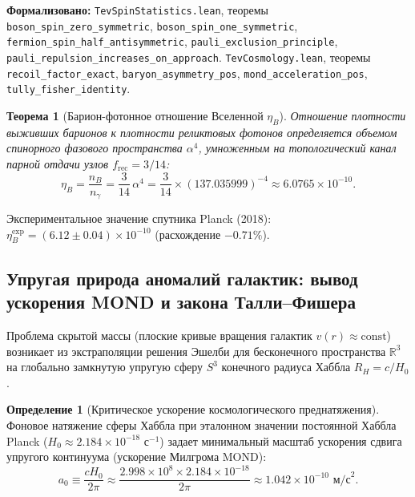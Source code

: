 \documentclass[11pt,a4paper]{article}
\newtheorem{theorem}{Теорема}
\theoremstyle{definition}
\newtheorem{definition}{Определение}
\theoremstyle{remark}
\begin{document}
\noindent\small\textbf{Формализовано:} \texttt{TevSpinStatistics.lean}, теоремы \texttt{boson_spin_zero_symmetric}, \texttt{boson_spin_one_symmetric}, \texttt{fermion_spin_half_antisymmetric}, \texttt{pauli_exclusion_principle}, \texttt{pauli_repulsion_increases_on_approach}.
\texttt{TevCosmology.lean}, теоремы \texttt{recoil_factor_exact}, \texttt{baryon_asymmetry_pos}, \texttt{mond_acceleration_pos}, \texttt{tully_fisher_identity}.

\begin{theorem}[Барион-фотонное отношение Вселенной $\eta_B$]
\label{thm:baryon_asymmetry_exact}
Отношение плотности выживших барионов к плотности реликтовых фотонов определяется объемом спинорного фазового пространства $\alpha^4$, умноженным на топологический канал парной отдачи узлов $f_{\mathrm{rec}} = 3/14$:
\begin{equation}
\eta_B = \frac{n_B}{n_\gamma} = \frac{3}{14} \, \alpha^4 = \frac{3}{14} \times (137.035999)^{-4} \approx 6.0765 \times 10^{-10}.
\label{eq:baryon_asymmetry_formula}
\end{equation}
\end{theorem}
Экспериментальное значение спутника Planck (2018): $\eta_B^{\mathrm{exp}} = (6.12 \pm 0.04) \times 10^{-10}$ (расхождение $-0.71\%$).

\subsection{Упругая природа аномалий галактик: вывод ускорения MOND и закона Талли--Фишера}

Проблема скрытой массы (плоские кривые вращения галактик $v(r) \approx \text{const}$) возникает из экстраполяции решения Эшелби для бесконечного пространства $\mathbb{R}^3$ на глобально замкнутую упругую сферу $S^3$ конечного радиуса Хаббла $R_H = c / H_0$.

\begin{definition}[Критическое ускорение космологического преднатяжения]
Фоновое натяжение сферы Хаббла при эталонном значении постоянной Хаббла Planck ($H_0 \approx 2.184 \times 10^{-18}\text{ с}^{-1}$) задает минимальный масштаб ускорения сдвига упругого континуума (ускорение Милгрома MOND):
\begin{equation}
a_0 \equiv \frac{c H_0}{2\pi} \approx \frac{2.998 \times 10^8 \times 2.184 \times 10^{-18}}{2\pi} \approx 1.042 \times 10^{-10}\text{ м/с}^2.
\label{eq:mond_acceleration_def}
\end{equation}
\end{definition}
\end{document}

